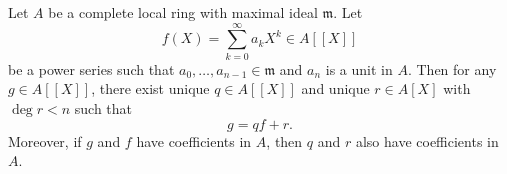 Let $A$ be a complete local ring with maximal ideal $\mathfrak{m}$. Let
$$f(X) = \sum_{k=0}^{\infty} a_k X^k \in A[[X]]$$
be a power series such that $a_0, \dots, a_{n-1} \in \mathfrak{m}$ and $a_n$ is a unit in $A$. Then for any $g \in A[[X]]$, there exist unique $q \in A[[X]]$ and unique $r \in A[X]$ with $\deg r < n$ such that
$$g = qf + r.$$
Moreover, if $g$ and $f$ have coefficients in $A$, then $q$ and $r$ also have coefficients in $A$.
